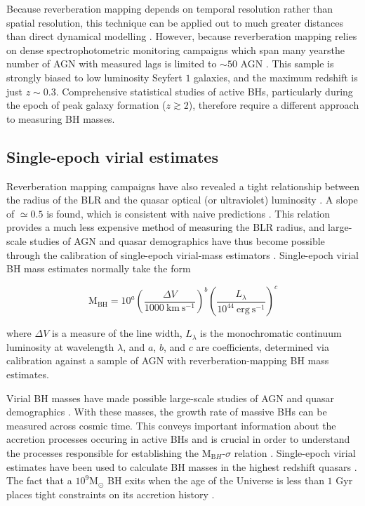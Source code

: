 Because reverberation mapping depends on temporal resolution rather than spatial resolution, this technique can be applied out to much greater distances than direct dynamical modelling \citep[e.g.][]{kormendy13}.
However, because reverberation mapping relies on dense spectrophotometric monitoring campaigns which span many yearsthe number of AGN with measured lags is limited to $\sim50$ AGN \citep[e.g.][]{kaspi00,peterson04,kaspi07,bentz09,denney10,barth11,grier12}. 
This sample is strongly biased to low luminosity Seyfert $1$ galaxies, and the maximum redshift is just $z\sim0.3$. 
Comprehensive statistical studies of active BHs, particularly during the epoch of peak galaxy formation ($z\gtrsim2$), therefore require a different approach to measuring BH masses. 

\subsection{Single-epoch virial estimates}

Reverberation mapping campaigns have also revealed a tight relationship between the radius of the BLR and the quasar optical (or ultraviolet) luminosity \citep[the ${\mathrm R_{BLR}-L}$ relation; e.g.][]{kaspi00,kaspi07}.
A slope of $\simeq0.5$ is found, which is consistent with naive predictions \citep[e.g.][]{peterson97}. 
This relation provides a much less expensive method of measuring the BLR radius, and large-scale studies of AGN and quasar demographics have thus become possible through the calibration of single-epoch virial-mass estimators \citep[e.g.][]{vestergaard02,mclure02,vestergaard06,mcgill08,wang09,rafiee11,park13}.
Single-epoch virial BH mass estimates normally take the form

\begin{equation}
  \label{eq:virialmass}
  \mathrm{M_{BH}} = 10^{a} \left( \frac{\Delta V}{1000~\mathrm{km~s^{-1}}} \right)^b \left( \frac{L_{\lambda}}{10^{44}~\mathrm{erg~s^{-1}}} \right)^c
\end{equation}

\noindent where $\Delta V$ is a measure of the line width, $L_\lambda$ is the monochromatic continuum luminosity at wavelength $\lambda$, and $a$, $b$, and $c$ are coefficients, determined via calibration against a sample of AGN with reverberation-mapping BH mass estimates. 

Virial BH masses have made possible large-scale studies of AGN and quasar demographics \citep[e.g.][]{greene05b,vestergaard06,vestergaard09,shen11,shen12,trakhtenbrot12}. 
With these masses, the growth rate of massive BHs can be measured across cosmic time. 
This conveys important information about the accretion processes occuring in active BHs \citep[e.g.][]{kollmeier06} and is crucial in order to understand the processes responsible for establishing the M$_{\mathrm BH}$-$\sigma$ relation \citep[e.g.][]{bennert11}.
Single-epoch virial estimates have been used to calculate BH masses in the highest redshift quasars \citep[e.g. a $10^9$M$_\odot$ BH in a redshift $z\sim7$ quasar;][]{mortlock11}. 
The fact that a $10^9$M$_\odot$ BH exits when the age of the Universe is less than $1$ Gyr places tight constraints on its accretion history \citep[e.g.][]{willott03}. 

